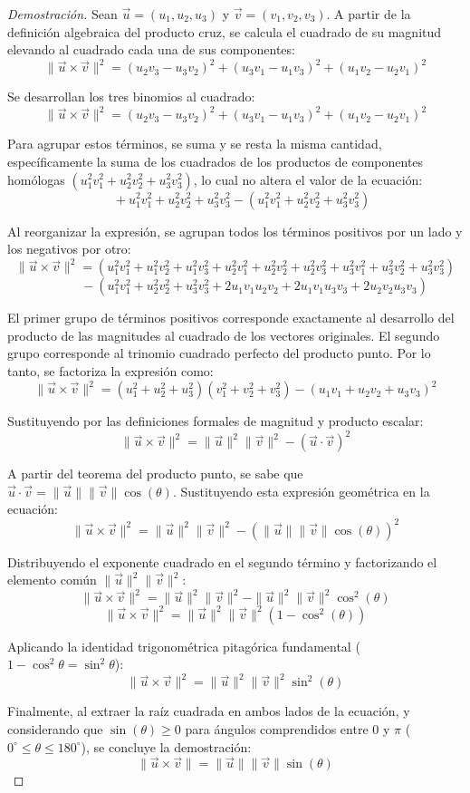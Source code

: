 \begin{proof}[Demostración]
Sean $\vec{u} = (u_1, u_2, u_3)$ y $\vec{v} = (v_1, v_2, v_3)$. A partir de la definición algebraica del producto cruz, se calcula el cuadrado de su magnitud elevando al cuadrado cada una de sus componentes:
\[ \|\vec{u} \times \vec{v}\|^2 = (u_2v_3 - u_3v_2)^2 + (u_3v_1 - u_1v_3)^2 + (u_1v_2 - u_2v_1)^2 \]

Se desarrollan los tres binomios al cuadrado:
\[ \|\vec{u} \times \vec{v}\|^2 = (u_2v_3 - u_3v_2)^2 + (u_3v_1 - u_1v_3)^2 + (u_1v_2 - u_2v_1)^2 \]

Para agrupar estos términos, se suma y se resta la misma cantidad, específicamente la suma de los cuadrados de los productos de componentes homólogas $(u_1^2v_1^2 + u_2^2v_2^2 + u_3^2v_3^2)$, lo cual no altera el valor de la ecuación:
\[ \quad + u_1^2v_1^2 + u_2^2v_2^2 + u_3^2v_3^2 - (u_1^2v_1^2 + u_2^2v_2^2 + u_3^2v_3^2) \]

Al reorganizar la expresión, se agrupan todos los términos positivos por un lado y los negativos por otro:
\[ \|\vec{u} \times \vec{v}\|^2 = (u_1^2v_1^2 + u_1^2v_2^2 + u_1^2v_3^2 + u_2^2v_1^2 + u_2^2v_2^2 + u_2^2v_3^2 + u_3^2v_1^2 + u_3^2v_2^2 + u_3^2v_3^2) \]
\[ \quad \quad \quad - (u_1^2v_1^2 + u_2^2v_2^2 + u_3^2v_3^2 + 2u_1v_1u_2v_2 + 2u_1v_1u_3v_3 + 2u_2v_2u_3v_3) \]

El primer grupo de términos positivos corresponde exactamente al desarrollo del producto de las magnitudes al cuadrado de los vectores originales. El segundo grupo corresponde al trinomio cuadrado perfecto del producto punto. Por lo tanto, se factoriza la expresión como:
\[ \|\vec{u} \times \vec{v}\|^2 = (u_1^2 + u_2^2 + u_3^2)(v_1^2 + v_2^2 + v_3^2) - (u_1v_1 + u_2v_2 + u_3v_3)^2 \]

Sustituyendo por las definiciones formales de magnitud y producto escalar:
\[ \|\vec{u} \times \vec{v}\|^2 = \|\vec{u}\|^2 \|\vec{v}\|^2 - (\vec{u} \cdot \vec{v})^2 \]

A partir del teorema del producto punto, se sabe que $\vec{u} \cdot \vec{v} = \|\vec{u}\|\|\vec{v}\|\cos(\theta)$. Sustituyendo esta expresión geométrica en la ecuación:
\[ \|\vec{u} \times \vec{v}\|^2 = \|\vec{u}\|^2 \|\vec{v}\|^2 - (\|\vec{u}\|\|\vec{v}\|\cos(\theta))^2 \]

Distribuyendo el exponente cuadrado en el segundo término y factorizando el elemento común $\|\vec{u}\|^2 \|\vec{v}\|^2$:
\[ \|\vec{u} \times \vec{v}\|^2 = \|\vec{u}\|^2 \|\vec{v}\|^2 - \|\vec{u}\|^2\|\vec{v}\|^2\cos^2(\theta) \]
\[ \|\vec{u} \times \vec{v}\|^2 = \|\vec{u}\|^2 \|\vec{v}\|^2 (1 - \cos^2(\theta)) \]

Aplicando la identidad trigonométrica pitagórica fundamental ($1 - \cos^2\theta = \sin^2\theta$):
\[ \|\vec{u} \times \vec{v}\|^2 = \|\vec{u}\|^2 \|\vec{v}\|^2 \sin^2(\theta) \]

Finalmente, al extraer la raíz cuadrada en ambos lados de la ecuación, y considerando que $\sin(\theta) \geq 0$ para ángulos comprendidos entre $0$ y $\pi$ ($0^\circ \leq \theta \leq 180^\circ$), se concluye la demostración:
\[ \|\vec{u} \times \vec{v}\| = \|\vec{u}\| \|\vec{v}\| \sin(\theta) \]
\end{proof}

